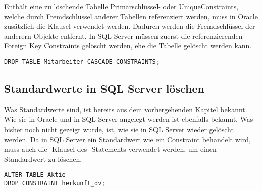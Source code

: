         Enthält eine zu löschende Tabelle Primär\-schlüssel- oder Unique\-Constraints, welche durch Fremd\-schlüssel anderer Tabellen referenziert werden, muss in Oracle zusätzlich die Klausel  verwendet werden. Dadurch werden die Fremdschlüssel der anderern Objekte entfernt. In SQL Server müssen zuerst die referenzierenden Foreign Key Constraints gelöscht werden, ehe die Tabelle gelöscht werden kann.
        \begin{lstlisting}[language=oracle_sql, caption={Eine Tabelle mit
        Fremdschlüsselbeziehungen löschen},label=sql09_22]
DROP TABLE Mitarbeiter CASCADE CONSTRAINTS;
        \end{lstlisting}
      \subsection{Standardwerte in SQL Server löschen}
        \label{sqlserverdefaultconstraint}
        Was Standardwerte sind, ist bereits aus dem vorhergehenden Kapitel bekannt. Wie sie in Oracle und in SQL Server angelegt werden ist ebenfalls bekannt. Was bisher noch nicht gezeigt wurde, ist, wie sie in SQL Server wieder gelöscht werden. Da in SQL Server ein Standardwert wie ein Constraint behandelt wird, muss auch die -Klausel des -Statements verwendet werden, um einen Standardwert zu löschen.
        \begin{lstlisting}[language=ms_sql,caption={Einen Standardwert in SQL Server löschen},label=sql09_23]
ALTER TABLE Aktie
DROP CONSTRAINT herkunft_dv;
        \end{lstlisting}
